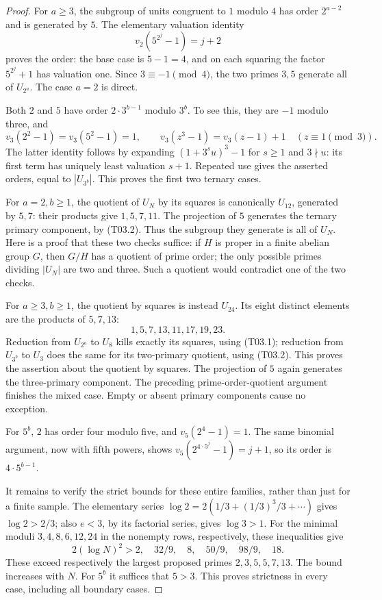 \begin{proof}
For $a\geq3$, the subgroup of units congruent to $1$ modulo $4$ has
order $2^{a-2}$ and is generated by $5$. The elementary valuation
identity
\[
                  v_2(5^{2^j}-1)=j+2
 \tag{T03.1}
\]
proves the order: the base case is $5-1=4$, and on each squaring the
factor $5^{2^j}+1$ has valuation one. Since $3\equiv-1\pmod4$, the
two primes $3,5$ generate all of $U_{2^a}$. The case $a=2$ is direct.

Both $2$ and $5$ have order $2\cdot3^{b-1}$ modulo $3^b$. To see this,
they are $-1$ modulo three, and
\[
 v_3(2^2-1)=v_3(5^2-1)=1,
 \qquad v_3(z^3-1)=v_3(z-1)+1\quad(z\equiv1\pmod3).
 \tag{T03.2}
\]
The latter identity follows by expanding $(1+3^s u)^3-1$ for
$s\geq1$ and $3\nmid u$: its first term has uniquely least
valuation $s+1$. Repeated use gives the asserted orders, equal to
$|U_{3^b}|$. This proves the first two ternary cases.

For $a=2,b\geq1$, the quotient of $U_N$ by its squares is canonically
$U_{12}$, generated by $5,7$: their products give $1,5,7,11$.
The projection of $5$ generates the ternary primary component, by (T03.2).
Thus the subgroup they generate is all of $U_N$. Here is a proof
that these two checks suffice: if $H$ is proper in a finite abelian
group $G$, then $G/H$ has a quotient of prime order; the only
possible primes dividing $|U_N|$ are two and three. Such a quotient
would contradict one of the two checks.

For $a\geq3,b\geq1$, the quotient by squares is instead $U_{24}$.
Its eight distinct elements are the products of $5,7,13$:
\[
                    1,5,7,13,11,17,19,23.
 \tag{T03.3}
\]
Reduction from $U_{2^a}$ to $U_8$ kills exactly its squares, using
(T03.1); reduction from $U_{3^b}$ to $U_3$ does the same for its
two-primary quotient, using (T03.2). This proves the assertion about
the quotient by squares. The projection of $5$ again generates the
three-primary component. The preceding prime-order-quotient argument
finishes the mixed case. Empty or absent primary components cause
no exception.

For $5^b$, $2$ has order four modulo five, and $v_5(2^4-1)=1$.
The same binomial argument, now with fifth powers, shows
$v_5(2^{4\cdot5^j}-1)=j+1$, so its order is $4\cdot5^{b-1}$.

It remains to verify the strict bounds for these entire families,
rather than just for a finite sample. The elementary series
$\log2=2(1/3+(1/3)^3/3+\cdots)$ gives $\log2>2/3$; also
$e<3$, by its factorial series, gives $\log3>1$. For the minimal
moduli $3,4,8,6,12,24$ in the nonempty rows, respectively,
these inequalities give
\[
 2(\log N)^2>2,\quad 32/9,\quad8,\quad50/9,\quad98/9,\quad18.
\]
These exceed respectively the largest proposed primes $2,3,5,5,7,13$.
The bound increases with $N$. For $5^b$ it suffices that $5>3$.
This proves strictness in every case, including all boundary cases.
\end{proof}

